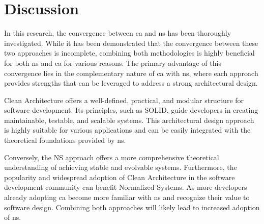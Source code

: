 \section{Discussion}

In this research, the convergence between \gls{ca} and \gls{ns} has been thoroughly
investigated. While it has been demonstrated that the convergence between these two
approaches is incomplete, combining both methodologies is highly beneficial for both
\gls{ns} and \gls{ca} for various reasons. The primary advantage of this convergence
lies in the complementary nature of \gls{ca} with \gls{ns}, where each approach provides
strengths that can be leveraged to address a strong architectural design. 

Clean Architecture offers a well-defined, practical, and modular structure for software
development. Its principles, such as SOLID, guide developers in creating maintainable,
testable, and scalable systems. This architectural design approach is highly suitable for
various applications and can be easily integrated with the theoretical foundations
provided by \gls{ns}. 

Conversely, the NS approach offers a more comprehensive theoretical understanding of
achieving stable and evolvable systems. Furthermore, the popularity and widespread
adoption of Clean Architecture in the software development community can benefit
Normalized Systems. As more developers already adopting \acrlong{ca} become more familiar
with \acrlong{ns} and recognize their value to software design. Combining both approaches
will likely lead to increased adoption of \acrlong{ns}.